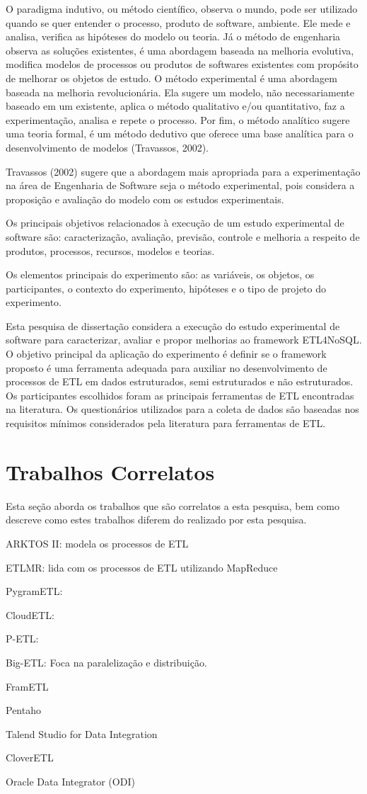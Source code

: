 O paradigma indutivo, ou método científico, observa o mundo, pode ser utilizado quando se quer entender o processo, produto de software, ambiente. Ele mede e analisa, verifica as hipóteses do modelo ou teoria.  Já o método de engenharia observa as soluções existentes, é uma abordagem baseada na melhoria evolutiva, modifica modelos de processos ou produtos de softwares existentes com propósito de melhorar os objetos de estudo. O método experimental é uma abordagem baseada na melhoria revolucionária. Ela sugere um modelo, não necessariamente baseado em um existente, aplica o método qualitativo e/ou quantitativo, faz a experimentação, analisa e repete o processo. Por fim, o método analítico sugere uma teoria formal, é um método dedutivo que oferece uma base analítica para o desenvolvimento de modelos (Travassos, 2002).

Travassos (2002) sugere que a abordagem mais apropriada para a experimentação na área de Engenharia de Software seja o método experimental, pois considera a proposição e avaliação do modelo com os estudos experimentais.

Os principais objetivos relacionados à execução de um estudo experimental de software são: caracterização, avaliação, previsão, controle e melhoria a respeito de produtos, processos, recursos, modelos e teorias.

Os elementos principais do experimento são: as variáveis, os objetos, os participantes, o contexto do experimento, hipóteses e o tipo de projeto do experimento.

Esta pesquisa de dissertação considera a execução do estudo experimental de software para caracterizar, avaliar e propor melhorias ao framework ETL4NoSQL. O objetivo principal da aplicação do experimento é definir se o framework proposto é uma ferramenta adequada para auxiliar no desenvolvimento de processos de ETL em dados estruturados, semi estruturados e não estruturados. Os participantes escolhidos foram as principais ferramentas de ETL encontradas na literatura. Os questionários utilizados para a coleta de dados são baseadas nos requisitos mínimos considerados pela literatura para ferramentas de ETL.


\section{Trabalhos Correlatos}
Esta seção aborda os trabalhos que são correlatos a esta pesquisa, bem como descreve como estes trabalhos diferem do realizado
por esta pesquisa.

ARKTOS II: modela os processos de ETL

ETLMR: lida com os processos de ETL utilizando MapReduce

PygramETL: 

CloudETL:

P-ETL:

Big-ETL: Foca na paralelização e distribuição.

FramETL

Pentaho

Talend Studio for Data Integration

CloverETL

Oracle Data Integrator (ODI)